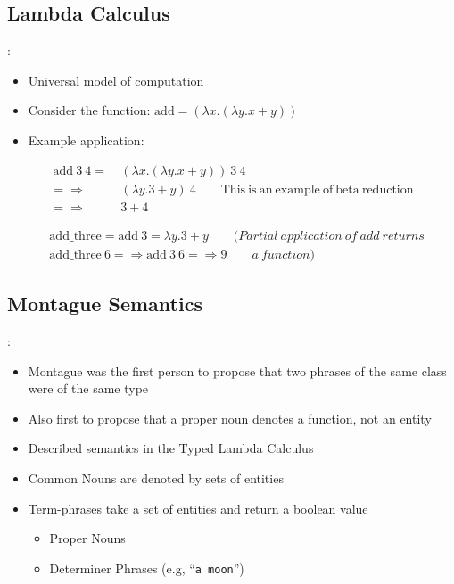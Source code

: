 \documentclass[logoontitle,tabu,supertabular,aspectratio=43]{preney-uwindsor-beamer}
\begin{document}
    \subsection{Lambda Calculus}
    \begin{frame}{\insertsection: \insertsubsection}
    \begin{itemize}
        \item Universal model of computation
        \item Consider the function: $\mathrm{add} = (\lambda x.(\lambda y.x + y))$
        \item Example application:
    \end{itemize}
    \begin{equation*}
        \begin{split}
            \ \mathrm{add}\ 3\ 4 =&\ (\lambda x.(\lambda y.x + y))\ 3\ 4 \\
            =\!\Rightarrow &\ (\lambda y.3 + y)\ 4 \qquad\mathrm{This\ is\ an\ example\ of\ beta\ reduction}\\
            =\!\Rightarrow &\ 3 + 4
        \end{split}
    \end{equation*}

    \begin{equation*}
        \begin{split}
            &\mathrm{add\_three} = \mathrm{add}\ 3 = \lambda y. 3 + y \qquad\mathit{(Partial\ application\ of\ add\ returns}\\
            &\mathrm{add\_three}\ 6 =\!\Rightarrow \mathrm{add}\ 3\ 6 =\!\Rightarrow 9 \qquad\mathit{a\ function)}
        \end{split}
    \end{equation*}
    \end{frame}

    \subsection{Montague Semantics}
    \begin{frame}{\insertsection: \insertsubsection}
        \begin{itemize}
            \item Montague was the first person to propose that two phrases of the same class were of the same type
            \item Also first to propose that a proper noun denotes a function, not an entity
            \item Described semantics in the Typed Lambda Calculus
            \item Common Nouns are denoted by sets of entities
            \item Term-phrases take a set of entities and return a boolean value
            \begin{itemize}
                \item Proper Nouns
                \item Determiner Phrases (e.g, ``\texttt{a moon}'')
            \end{itemize}
        \end{itemize}
    \end{frame}
\end{document}
